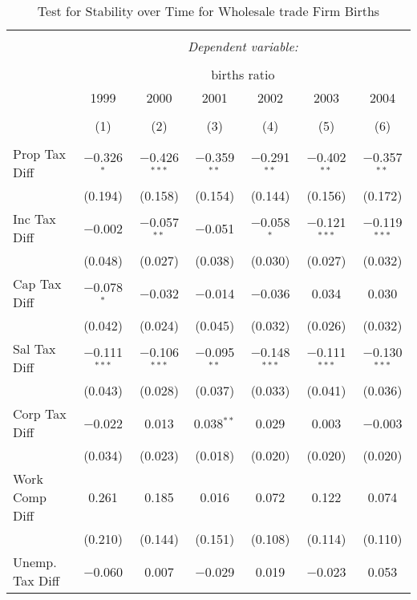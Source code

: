 
\begin{table}[!htbp] \centering 
  \caption{Test for Stability over Time for  Wholesale trade Firm Births} 
  \label{42year} 
\small 
\begin{tabular}{@{\extracolsep{5pt}}lcccccc} 
\\[-1.8ex]\hline 
\hline \\[-1.8ex] 
 & \multicolumn{6}{c}{\textit{Dependent variable:}} \\ 
\cline{2-7} 
\\[-1.8ex] & \multicolumn{6}{c}{births ratio} \\ 
 & 1999 & 2000 & 2001 & 2002 & 2003 & 2004 \\ 
\\[-1.8ex] & (1) & (2) & (3) & (4) & (5) & (6)\\ 
\hline \\[-1.8ex] 
 Prop Tax Diff & $-$0.326$^{*}$ & $-$0.426$^{***}$ & $-$0.359$^{**}$ & $-$0.291$^{**}$ & $-$0.402$^{**}$ & $-$0.357$^{**}$ \\ 
  & (0.194) & (0.158) & (0.154) & (0.144) & (0.156) & (0.172) \\ 
  Inc Tax Diff & $-$0.002 & $-$0.057$^{**}$ & $-$0.051 & $-$0.058$^{*}$ & $-$0.121$^{***}$ & $-$0.119$^{***}$ \\ 
  & (0.048) & (0.027) & (0.038) & (0.030) & (0.027) & (0.032) \\ 
  Cap Tax Diff & $-$0.078$^{*}$ & $-$0.032 & $-$0.014 & $-$0.036 & 0.034 & 0.030 \\ 
  & (0.042) & (0.024) & (0.045) & (0.032) & (0.026) & (0.032) \\ 
  Sal Tax Diff & $-$0.111$^{***}$ & $-$0.106$^{***}$ & $-$0.095$^{**}$ & $-$0.148$^{***}$ & $-$0.111$^{***}$ & $-$0.130$^{***}$ \\ 
  & (0.043) & (0.028) & (0.037) & (0.033) & (0.041) & (0.036) \\ 
  Corp Tax Diff & $-$0.022 & 0.013 & 0.038$^{**}$ & 0.029 & 0.003 & $-$0.003 \\ 
  & (0.034) & (0.023) & (0.018) & (0.020) & (0.020) & (0.020) \\ 
  Work Comp Diff & 0.261 & 0.185 & 0.016 & 0.072 & 0.122 & 0.074 \\ 
  & (0.210) & (0.144) & (0.151) & (0.108) & (0.114) & (0.110) \\ 
  Unemp. Tax Diff & $-$0.060 & 0.007 & $-$0.029 & 0.019 & $-$0.023 & 0.053 \\ 

\end{tabular}
\end{table}
